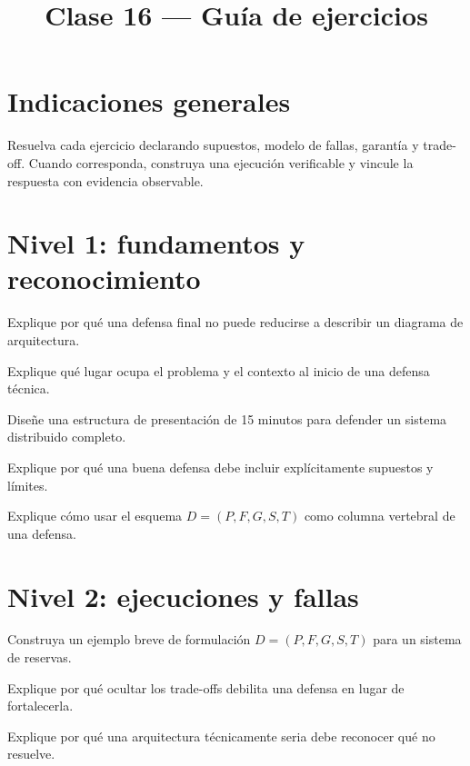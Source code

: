 \documentclass[variant=guia,cover=institutional,mode=screen]{ua-engineering-v6-article}
\title{Clase 16 --- Guía de ejercicios}
\author{\UAProfessor}
\date{\UADate}
\begin{document}
\section{Indicaciones generales}
Resuelva cada ejercicio declarando supuestos, modelo de fallas, garantía y trade-off. Cuando corresponda, construya una ejecución verificable y vincule la respuesta con evidencia observable.

\section{Nivel 1: fundamentos y reconocimiento}
\begin{uaexercise}
Explique por qué una defensa final no puede reducirse a describir un diagrama de arquitectura.
\end{uaexercise}

\begin{uaexercise}
Explique qué lugar ocupa el problema y el contexto al inicio de una defensa técnica.
\end{uaexercise}

\begin{uaexercise}
Diseñe una estructura de presentación de 15 minutos para defender un sistema distribuido completo.
\end{uaexercise}

\begin{uaexercise}
Explique por qué una buena defensa debe incluir explícitamente supuestos y límites.
\end{uaexercise}

\begin{uaexercise}
Explique cómo usar el esquema $D=(P,F,G,S,T)$ como columna vertebral de una defensa.
\end{uaexercise}


\section{Nivel 2: ejecuciones y fallas}
\begin{uaexercise}
Construya un ejemplo breve de formulación $D=(P,F,G,S,T)$ para un sistema de reservas.
\end{uaexercise}

\begin{uaexercise}
Explique por qué ocultar los trade-offs debilita una defensa en lugar de fortalecerla.
\end{uaexercise}

\begin{uaexercise}
Explique por qué una arquitectura técnicamente seria debe reconocer qué no resuelve.
\end{uaexercise}
\end{document}
